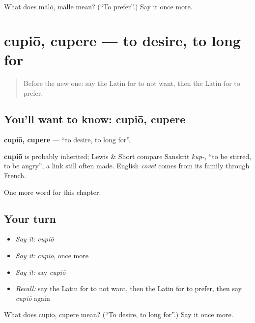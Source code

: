 \begin{tcolorbox}[breakable,colback=teal!4,colframe=teal!35!black,title={Before you move on}]
What does mālō, mālle mean? (\textquotedblleft{}To prefer\textquotedblright{}.) Say it once more.
\end{tcolorbox}
\section[cupiō, cupere]{cupiō, cupere — to desire, to long for}

\label{lesson:LA-C111-cupio}



\begin{quote}
Before the new one: say the Latin for to not want, then the Latin for to prefer.
\end{quote}

\subsection*{You'll want to know: cupiō, cupere}
\textbf{cupiō, cupere} — \textquotedblleft{}to desire, to long for\textquotedblright{}.

\begin{cousinweb}
\textbf{cupiō} is probably inherited; Lewis \& Short compare Sanskrit \emph{kup-}, \textquotedblleft{}to be stirred, to be angry\textquotedblright{}, a link still often made. English \emph{covet} comes from its family through French.
\end{cousinweb}

\begin{grammarlens}[title={What you've built}]
One more word for this chapter.
\end{grammarlens}

\subsection*{Your turn}
\begin{itemize}
\raggedright
  \item \emph{Say it:} \emph{cupiō}
  \item \emph{Say it:} \emph{cupiō}, once more
  \item \emph{Say it:} say \emph{cupiō}
  \item \emph{Recall:} say the Latin for to not want, then the Latin for to prefer, then say \emph{cupiō} again
\end{itemize}

\begin{tcolorbox}[breakable,colback=teal!4,colframe=teal!35!black,title={Before you move on}]
What does cupiō, cupere mean? (\textquotedblleft{}To desire, to long for\textquotedblright{}.) Say it once more.
\end{tcolorbox}

